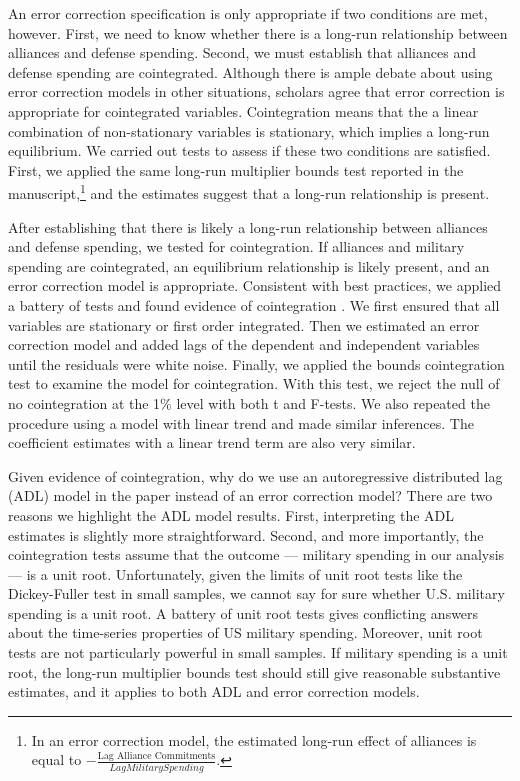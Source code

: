 \documentclass[12pt]{article}
\begin{document}
An error correction specification is only appropriate if two conditions are met, however. 
First, we need to know whether there is a long-run relationship between alliances and defense spending. 
Second, we must establish that alliances and defense spending are cointegrated. 
Although there is ample debate about using error correction models in other situations, scholars agree that error correction is appropriate for cointegrated variables\citep{EngleGranger1987, DeBoefKeele2008, GrantLebo2016, Ennsetal2016}. 
Cointegration means that the a linear combination of non-stationary variables is stationary, which implies a long-run equilibrium.  
We carried out tests to assess if these two conditions are satisfied. 
First, we applied the same long-run multiplier bounds test reported in the manuscript,\footnote{In an error correction model, the estimated long-run effect of alliances is equal to $-\frac{\mbox{Lag Alliance Commitments}}{Lag Military Spending}$.} and the estimates suggest that a long-run relationship is present. 


After establishing that there is likely a long-run relationship between alliances and defense spending, we tested for cointegration. 
If alliances and military spending are cointegrated, an equilibrium relationship is likely present, and an error correction model is appropriate.    
Consistent with best practices, we applied a battery of tests and found evidence of cointegration \citep{Philips2018}. 
We first ensured that all variables are stationary or first order integrated. 
Then we estimated an error correction model and added lags of the dependent and independent variables until the residuals were white noise. 
Finally, we applied the bounds cointegration test to examine the model for cointegration. With this test, we reject the null of no cointegration at the 1\% level with both t and F-tests. 
We also repeated the procedure using a model with linear trend and made similar inferences. 
The coefficient estimates with a linear trend term are also very similar.


Given evidence of cointegration, why do we use an autoregressive distributed lag (ADL) model in the paper instead of an error correction model? 
There are two reasons we highlight the ADL model results. 
First, interpreting the ADL estimates is slightly more straightforward. 
Second, and more importantly, the cointegration tests assume that the outcome --- military spending in our analysis --- is a unit root. 
Unfortunately, given the limits of unit root tests like the Dickey-Fuller test in small samples, we cannot say for sure whether U.S. military spending is a unit root. 
A battery of unit root tests gives conflicting answers about the time-series properties of US military spending. 
Moreover, unit root tests are not particularly powerful in small samples. 
If military spending is a unit root, the long-run multiplier bounds test should still give reasonable substantive estimates, and it applies to both ADL and error correction models.
\end{document}
